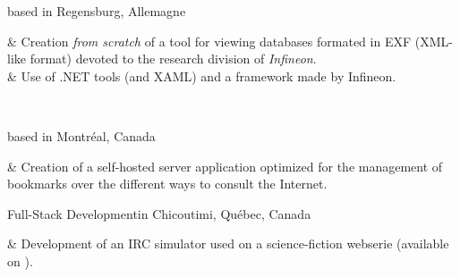 	{ based in Regensburg, Allemagne}

\begin{cvstate}
	\begin{cvtable}{2.5ex}
		{\tiny {}} & Creation \textit{from scratch} of a tool for viewing databases formated in EXF (XML-like format) devoted to the research division of \textit{Infineon}.\\
		{\tiny {}} & Use of .NET tools (\csharp and XAML) and a framework made by Infineon.\\
	\end{cvtable}

	\\
\end{cvstate}


	{ based in Montréal, Canada}

\begin{cvstate}
	\begin{cvtable}{2.5ex}
		{\tiny {}} & Creation of a self-hosted server application optimized for the management of bookmarks over the different ways to consult the Internet.
	\end{cvtable}

\end{cvstate}

	{}{Full-Stack Development}{}{}{in Chicoutimi, Québec, Canada}

\begin{cvstate}
	\begin{cvtable}{2.5ex}
		{\tiny {}} & Development of an IRC simulator used on a science-fiction webserie (available on ).
	\end{cvtable}

\end{cvstate}
